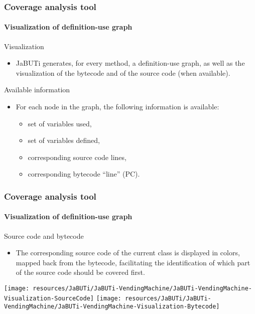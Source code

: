 \begin{frame}[parent={cmap:coverage-analysis-tool},hasnext=true,hasprev=true]
\frametitle{Coverage analysis tool}
\framesubtitle{Visualization of definition-use graph}
\label{concept:jabuti-visualization}

\begin{block:fact}{Visualization}
\begin{itemize}
	\item JaBUTi generates, for every method, a definition-use graph,
	 as well as the visualization of the bytecode and of the source code
	 (when available).
\end{itemize}
\end{block:fact}

\begin{block:fact}{Available information}
\begin{itemize}
	\item For each node in the graph, the following information is available:
	\begin{itemize}
		\item set of variables used,
		\item set of variables defined,
		\item corresponding source code lines,
		\item corresponding bytecode ``line'' (PC).
	\end{itemize}
\end{itemize}
\end{block:fact}
\end{frame}


\begin{frame}
\frametitle{Coverage analysis tool}
\framesubtitle{Visualization of definition-use graph}

\begin{block:fact}{Source code and bytecode}
\begin{itemize}
	\item The corresponding source code of the current class is displayed in
	colors, mapped back from the bytecode, facilitating the
	identification of which part of the source code should be covered first.
\end{itemize}
\end{block:fact}

\begin{center}
\texttt{[image: resources/JaBUTi/JaBUTi-VendingMachine/JaBUTi-VendingMachine-Visualization-SourceCode]}
\texttt{[image: resources/JaBUTi/JaBUTi-VendingMachine/JaBUTi-VendingMachine-Visualization-Bytecode]}
\end{center}
\end{frame}


